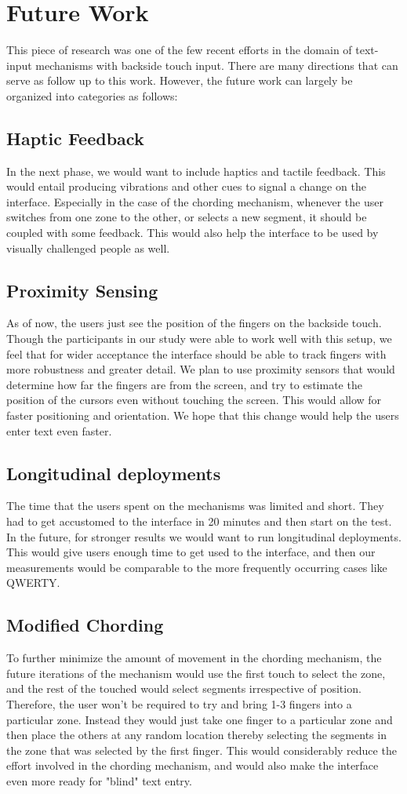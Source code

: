 \section{Future Work}
This piece of research was one of the few recent efforts in the domain of text-input mechanisms with backside touch input. There are many directions that can serve as follow up to this work. However, the future work can largely be organized into categories as follows:
\subsection{Haptic Feedback}
In the next phase, we would want to include haptics and tactile feedback. This would entail producing vibrations and other cues to signal a change on the interface. Especially in the case of the chording mechanism, whenever the user switches from one zone to the other, or selects a new segment, it should be coupled with some feedback. This would also help the interface to be used by visually challenged people as well. 
\subsection{Proximity Sensing}
As of now, the users just see the position of the fingers on the backside touch. Though the participants in our study were able to work well with this setup, we feel that for wider acceptance the interface should be able to track fingers with more robustness and greater detail. We plan to use proximity sensors that would determine how far the fingers are from the screen, and try to estimate the position of the cursors even without touching the screen. This would allow for faster positioning and orientation. We hope that this change would help the users enter text even faster.
\subsection{Longitudinal deployments} 
The time that the users spent on the mechanisms was limited and short. They had to get accustomed to the interface in 20 minutes and then start on the test. In the future, for stronger results we would want to run longitudinal deployments. This would give users enough time to get used to the interface, and then our measurements would be comparable to the more frequently occurring cases like QWERTY.
\subsection{Modified Chording}
To further minimize the amount of movement in the chording mechanism, the future iterations of the mechanism would use the first touch to select the zone, and the rest of the touched would select segments irrespective of position. Therefore, the user won't be required to try and bring 1-3 fingers into a particular zone. Instead they would just take one finger to a particular zone and then place the others at any random location thereby selecting the segments in the zone that was selected by the first finger. This would considerably reduce the effort involved in the chording mechanism, and would also make the interface even more ready for "blind" text entry.
